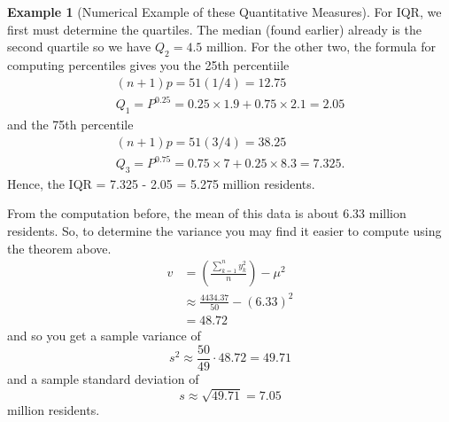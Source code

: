 \documentclass[10pt,]{book}
\theoremstyle{plain}
\theoremstyle{definition}
\theoremstyle{definition}
\newtheorem{example}[theorem]{Example}
\numberwithin{equation}{section}
\begin{document}
\begin{example}[Numerical Example of these Quantitative Measures]
For IQR, we first must determine the quartiles. The median (found earlier) already is the second quartile so we have \(Q_2 = 4.5\) million. For the other two, the formula for computing percentiles gives you the 25th percentiile
\begin{gather*}
(n+1)p = 51(1/4) = 12.75\\
Q_1 = P^{0.25} = 0.25 \times 1.9 + 0.75 \times 2.1 = 2.05
\end{gather*}
and the 75th percentile
\begin{gather*}
(n+1)p = 51(3/4) = 38.25\\
Q_3 = P^{0.75} = 0.75 \times 7 + 0.25 \times 8.3 = 7.325.
\end{gather*}
Hence, the IQR = 7.325 - 2.05 = 5.275 million residents.
%
\par

From the computation before, the mean of this data is about 6.33
million residents. So, to determine the variance you may find it easier to compute using the theorem above. 
\begin{align*}
 v & = \left ( \frac{\sum_{k=1}^n y_k^2 }{n} \right ) - \mu^2
\\
 & \approx \frac{4434.37}{50} - (6.33)^2
\\
 & = 48.72

\end{align*}
and so you get a sample variance of
\begin{equation*} s^2 \approx \frac{50}{49} \cdot 48.72 = 49.71\end{equation*}
and a sample standard deviation of
\begin{equation*}s \approx \sqrt{49.71} = 7.05\end{equation*} million residents.
%
\end{example}
\typeout{************************************************}
\typeout{************************************************}
\end{document}
